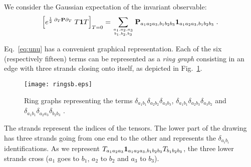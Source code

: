 \documentclass[10pt]{article}
\theoremstyle{plain}
\theoremstyle{definition}
\newcommand{\bP}{ {\bf P} }
\begin{document}
We consider the Gaussian expectation of the invariant observable:
\begin{align}\label{eq:unu}
 \left[ e^{\frac{1}{2} \;  \partial_T \bP \partial_T    }      \;  T {\bf 1} T \right]_{T=0} = \sum_{\genfrac{}{}{0pt}{}{a_1,a_2,a_3}{b_1,b_2,b_3}}
  \bP_{a_1a_2a_3,b_1b_2b_3} {\bf 1}_{a_1a_2a_3,b_1b_2b_3} \;. 
\end{align}

Eq.~\eqref{eq:unu} has a convenient graphical representation. Each of the six (respectively fifteen) terms can be represented as a \emph{ring graph} consisting in an edge with three strands closing onto itself, as
depicted in Fig.~\ref{fig:ring}.
\begin{figure}[htb]
 \begin{center}
 \texttt{[image: ringsb.eps]}  
 \caption{Ring graphs representing the terms $\delta_{a_1b_1}\delta_{a_2b_2} \delta_{a_3b_3} $, $\delta_{a_1b_1}\delta_{a_2b_3} \delta_{a_3b_2} $ and $\delta_{a_1b_1}\delta_{a_2a_3} \delta_{b_2b_3} $ .} \label{fig:ring}
 \end{center}
 \end{figure}
The strands represent the indices of the tensors. The lower part of the drawing has three strands going from one end to the other and represents the $\delta_{a_i b_i} $ identifications.
As we represent $ T_{a_1a_2a_3} {\bf 1}_{a_1a_2a_3,b_1b_2b_3} T_{b_1b_2b_3}$, the three lower strands cross ($a_1$ goes to $b_1$, $a_2$ to $b_2$ and $a_3$ to $b_3$). 
\end{document}
